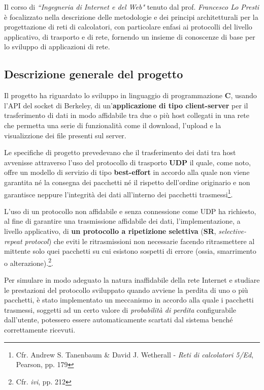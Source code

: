 \documentclass[10pt,a4paper, titlepage]{article}
\begin{document}
Il corso di \textit{``Ingegneria di Internet e del Web"} tenuto dal prof. \textit{Francesco Lo Presti} è focalizzato nella descrizione delle metodologie e dei principi architetturali per la progettazione di reti di calcolatori, con particolare enfasi ai protocolli del livello applicativo, di trasporto e di rete, fornendo un insieme di conoscenze di base per lo sviluppo di applicazioni di rete.

\subsection{Descrizione generale del progetto}

Il progetto ha riguardato lo sviluppo in linguaggio di programmazione \textbf{C}, usando l’API del socket di Berkeley, di un'\textbf{applicazione di tipo client-server} per il trasferimento di dati in modo affidabile tra due o più host collegati in una rete che permetta una serie di funzionalità come il download, l'upload e la visualizzione dei file presenti sul server.

Le specifiche di progetto prevedevano che il trasferimento dei dati tra host avvenisse attraverso l'uso del protocollo di trasporto \textbf{UDP} il quale, come noto, offre un modello di servizio di tipo \textbf{best-effort} in accordo alla quale non viene garantita né la consegna dei pacchetti né il rispetto dell'ordine originario e non garantisce neppure l'integrità dei dati all'interno dei pacchetti trasmessi\footnote{Cfr. Andrew S. Tanenbaum \& David J. Wetherall - \textit{Reti di calcolatori 5/Ed}, Pearson, pp. 179}. 

L'uso di un protocollo non affidabile e senza connessione come UDP ha richiesto, al fine di garantire una trasmissione affidabile dei dati, l'implementazione, a livello applicativo, di \textbf{un protocollo a ripetizione selettiva} (\textbf{SR}, \textit{selective-repeat protocol}) che eviti le ritrasmissioni non necessarie facendo ritrasmettere al mittente solo quei pacchetti su cui esistono sospetti di errore (ossia, smarrimento o alterazione).\footnote{Cfr. \textit{ivi}, pp. 212}. 

Per simulare in modo adeguato la natura inaffidabile della rete Internet e studiare le prestazioni del protocollo sviluppato quando avviene la perdita di uno o più pacchetti, è stato implementato un meccanismo in accordo alla quale i pacchetti trasmessi, soggetti ad un certo valore di \textit{probabilità di perdita} configurabile dall'utente, potessero essere automaticamente scartati dal sistema benché correttamente ricevuti.
\end{document}
